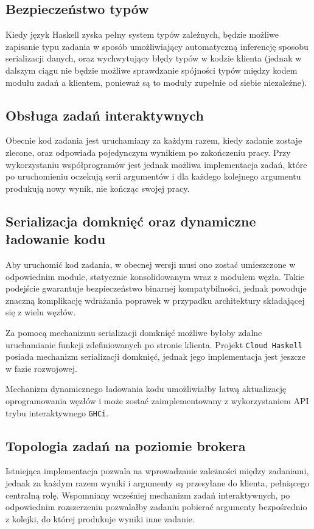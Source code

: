 \subsection*{Bezpieczeństwo typów}
Kiedy język Haskell zyska pełny system typów zależnych, będzie możliwe zapisanie typu zadania w sposób umożliwiający automatyczną inferencję sposobu serializacji danych, oraz wychwytujący błędy typów w kodzie klienta (jednak w dalszym ciągu nie będzie możliwe sprawdzanie spójności typów między kodem modułu zadań a klientem, ponieważ są to moduły zupełnie od siebie niezależne).

\subsection*{Obsługa zadań interaktywnych}
Obecnie kod zadania jest uruchamiany za każdym razem, kiedy zadanie zostaje zlecone, oraz odpowiada pojedynczym wynikiem po zakończeniu pracy. Przy wykorzystaniu współprogramów jest jednak możliwa implementacja zadań, które po uruchomieniu oczekują serii argumentów i dla każdego kolejnego argumentu produkują nowy wynik, nie kończąc swojej pracy.

\subsection*{Serializacja domknięć oraz dynamiczne ładowanie kodu}
Aby uruchomić kod zadania, w obecnej wersji musi ono zostać umieszczone w odpowiednim module, statycznie konsolidowanym wraz z modułem węzła. Takie podejście gwarantuje bezpieczeństwo binarnej kompatybilności, jednak powoduje znaczną komplikację wdrażania poprawek w przypadku architektury składającej się z wielu węzłów. 

Za pomocą mechanizmu serializacji domknięć możliwe byłoby zdalne uruchamianie funkcji zdefiniowanych po stronie klienta. Projekt \lstinline{Cloud Haskell} posiada mechanizm serializacji domknięć, jednak jego implementacja jest jeszcze w fazie rozwojowej.

Mechanizm dynamicznego ładowania kodu umożliwiałby łatwą aktualizację oprogramowania węzłów i może zostać zaimplementowany z wykorzystaniem API trybu interaktywnego \lstinline{GHCi}.

\subsection*{Topologia zadań na poziomie brokera}
Istniejąca implementacja pozwala na wprowadzanie zależności między zadaniami, jednak za każdym razem wyniki i argumenty są przesyłane do klienta, pełniącego centralną rolę. Wspomniany wcześniej mechanizm zadań interaktywnych, po odpowiednim rozszerzeniu pozwalałby zadaniu pobierać argumenty bezpośrednio z kolejki, do której produkuje wyniki inne zadanie.

